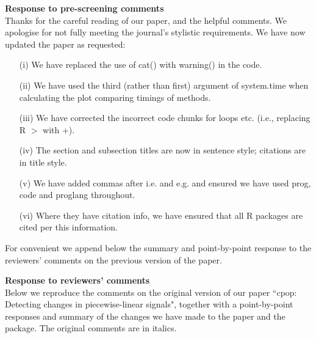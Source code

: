 \documentclass[12pt]{article}
\begin{document}
\maketitle

\noindent
{\bf Response to pre-screening comments}
\\

Thanks for the careful reading of our paper, and the helpful comments. We apologise for not fully meeting the journal's stylistic requirements. We have now updated the paper as requested:
\begin{itemize}
\item[(i)] We have replaced the use of cat() with warning() in the code.
\item[(ii)] We have used the third (rather than first) argument of system.time when calculating the plot comparing timings of methods.
\item[(iii)] We have corrected the incorrect code chunks for loops etc. (i.e., replacing R $>$ with +).
\item[(iv)] The section and subsection titles are now in sentence style; citations are in title style.
\item[(v)] We have added commas after i.e. and e.g. and ensured we have used prog, code and proglang throughout.
\item[(vi)] Where they have citation info, we have ensured that all R packages are cited per this information.
\end{itemize}

For convenient we append below the summary and point-by-point response to the reviewers' comments on the previous version of the paper.

\pagebreak
\noindent
{\bf Response to reviewers' comments}
\\

Below we reproduce the comments on the original version of our paper ``cpop: Detecting changes in piecewise-linear signals", together with a point-by-point responses and summary of the changes we have made to the paper and the package. The original comments are in italics.
\end{document}
